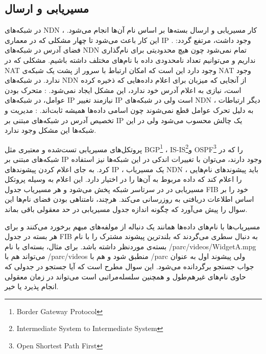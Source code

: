 \subsection{مسیریابی و ارسال}
\label{routing-forwarding}
در شبکه‌های NDN ، کار مسیریابی و ارسال بسته‌ها بر اساس نام آن‌ها انجام می‌شود. این کار باعث می‌شود تا چهار مشکلی که در معماری IP وجود داشت، مرتفع گردد:‌ 
 . فضای آدرس در شبکه‌های NDN تمام نمی‌شود چون هیچ محدودیتی برای نام‌گذاری نداریم و می‌توانیم تعداد نامحدودی داده با نام‌های مختلف داشته باشیم. 
  
مشکلی که در NAT وجود دارد این است که امکان ارتباط با سرور از پشت یک شبکه‌ی NAT وجود ندارد. در شبکه‌های NDN از آنجایی که میزبان برای اعلام داده‌هایی که ذخیره کرده است، نیازی به اعلام آدرس خود ندارد، این مشکل ایجاد نمی‌شود.  
 : متحرک بودن عوامل، در شبکه‌های IP نیازمند تغییر IP است ولی در شبکه‌های NDN ، دیگر ارتباطات به دلیل تحرک عوامل قطع نمی‌شوند چون اسامی داده‌ها همیشه ثابت‌اند. 
 :‌ مدیریت و تخصیص آدرس در شبکه‌های مبتنی بر IP یک چالش محسوب می‌شود ولی در این شبکه‌ها این مشکل وجود ندارد. 

پروتکل‌های مسیریابی تست‌شده و معتبری مثل BGP\footnote{Border Gateway Protocol} ،
IS-IS\footnote{Intermediate System to Intermediate System}و 
OSPF\footnote{Open Shortest Path First}
را که در شبکه‌های مبتنی بر IP وجود دارند، می‌توان با تغییرات اندکی در این شبکه‌ها نیز استفاده کرد. به جای اعلام کردن پیشوندهای IP ، یک مسیریاب NDN ، باید پیشوندهای نام‌هایی را اعلام کند که داده مربوط به آن‌ها را در اختیار دارد. 
این اعلام به وسیله پروتکل مسیریابی در در سرتاسر شبکه پخش می‌شود و هر مسیریاب جدول FIB خود را بر اساس اطلاعات دریافتی به روزرسانی می‌کند. هرچند، نامتناهی بودن فضای نام‌ها این سوال را پیش می‌آورد که چگونه اندازه جدول مسیریابی در حد معقولی باقی بماند. 

مسیریاب‌ها با نام‌‌های داده‌‌ها همانند یک دنباله از مولفه‌های مبهم برخورد می‌کنند و برای هر بسته در جدول FIB به دنبال سطری می‌گردند که بلندترین پیشوند مشترک را با نام بسته‌ی موردنظر داشته باشد. برای مثال، بسته‌ای با نام /parc/videos/WidgetA.mpg می‌تواند هم با /parc/videos منطبق شود و هم با /parc ولی پیشوند اول به عنوان جواب جستجو برگردانده می‌شود.  این سوال مطرح است که آیا جستجو در جدولی که حاوی نام‌های غیرهم‌طول و همچنین سلسله‌مراتبی است می‌تواند در زمان معقولی انجام پذیرد یا خیر. 


